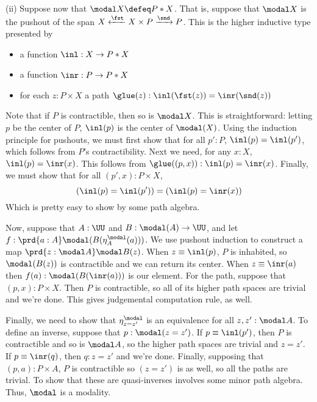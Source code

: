 \vspace{.1in}
\noindent
(ii) Suppose now that $\modal X \defeq P * X$.  That is, suppose that $\modal X$ is
the pushout of the span $X \xleftarrow{\fst} X \times P \xrightarrow{\snd}
P$.  This is the higher inductive type presented by



\begin{itemize}
\item  a function $\inl : X \to P * X$

\item  a function $\inr : P \to P * X$

\item  for each $z : P \times X$ a path $\glue(z) : \inl(\fst(z)) = \inr(\snd(z))$

\end{itemize}
Note that if $P$ is contractible, then so is $\modal X$.  This is
straightforward: letting $p$ be the center of $P$, $\inl(p)$ is the center of
$\modal(X)$.  Using the induction principle for pushouts, we must first show
that for all $p' : P$, $\inl(p) = \inl(p')$, which follows from $P$'s
contractibility.  Next we need, for any $x : X$, $\inl(p) = \inr(x)$.  This
follows from $\glue((p, x)) : \inl(p) = \inr(x)$.  Finally, we must show that
for all $(p', x) : P \times X$, 
\[
  (\inl(p) = \inl(p')) = (\inl(p) = \inr(x))
\]
Which is pretty easy to show by some path algebra.


Now, suppose that $A : \UU$ and $B : \modal(A) \to \UU$, and let $f : \prd{a:A}
\modal(B(\eta^{\modal}_{A}(a)))$.  We use pushout induction to construct a map
$\prd{z:\modal A} \modal B(z)$.  When $z \equiv \inl(p)$, $P$ is inhabited, so
$\modal (B (z))$ is contractible and we can return its center.  When $z \equiv
\inr(a)$ then $f(a) : \modal(B(\inr(a)))$ is our element.  For the path,
suppose that $(p, x) : P \times X$.  Then $P$ is contractible, so all of its
higher path spaces are trivial and we're done.  This gives judgemental
computation rule, as well.


Finally, we need to show that $\eta^{\modal}_{z = z'}$ is an equivalence for
all $z, z' : \modal A$.  To define an inverse, suppose that $p : \modal(z =
z')$.  If $p \equiv \inl(p')$, then $P$ is contractible and so is $\modal A$,
so the higher path spaces are trivial and $z = z'$.  If $p \equiv \inr(q)$,
then $q : z = z'$ and we're done.  Finally, supposing that $(p, a) : P \times
A$, $P$ is contractible so $(z = z')$ is as well, so all the paths are trivial.
To show that these are quasi-inverses involves some minor path algebra.  Thus,
$\modal$ is a modality.


